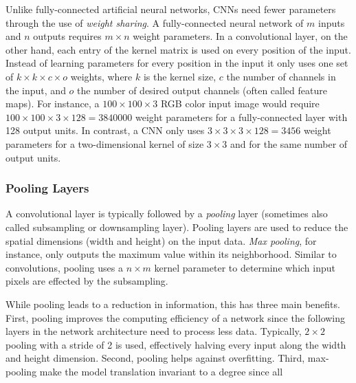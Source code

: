 Unlike fully-connected artificial neural networks, CNNs need fewer parameters through the use of \emph{weight sharing}. A fully-connected neural network of $m$ inputs and $n$ outputs requires $m \times n$ weight parameters. In a convolutional layer, on the other hand, each entry of the kernel matrix is used on every position of the input. Instead of learning parameters for every position in the input it only uses one set of $k \times k \times c \times o$ weights, where $k$ is the kernel size, $c$ the number of channels in the input, and $o$ the number of desired output channels (often called feature maps). For instance, a $100 \times 100 \times 3$ RGB color input image would require $100 \times 100 \times 3 \times 128 = \num{3840000}$ weight parameters for a fully-connected layer with \num{128} output units. In contrast, a CNN only uses $3 \times 3 \times 3 \times 128 = \num{3456}$ weight parameters for a two-dimensional kernel of size $3 \times 3$ and for the same number of output units.


\subsubsection{Pooling Layers}
A convolutional layer is typically followed by a \emph{pooling} layer (sometimes also called subsampling or downsampling layer). Pooling layers are used to reduce the spatial dimensions (width and height) on the input data. \emph{Max pooling}, for instance, only outputs the maximum value within its neighborhood. Similar to convolutions, pooling uses a $n \times m$ kernel parameter to determine which input pixels are effected by the subsampling.

	While pooling leads to a reduction in information, this has three main benefits. First, pooling improves the computing efficiency of a network since the following layers in the network architecture need to process less data. Typically, $2 \times 2$ pooling with a stride of \num{2} is used, effectively halving every input along the width and height dimension. 	
	Second, pooling helps against overfitting.
	Third, max-pooling make the model translation invariant to a degree since all 
	
